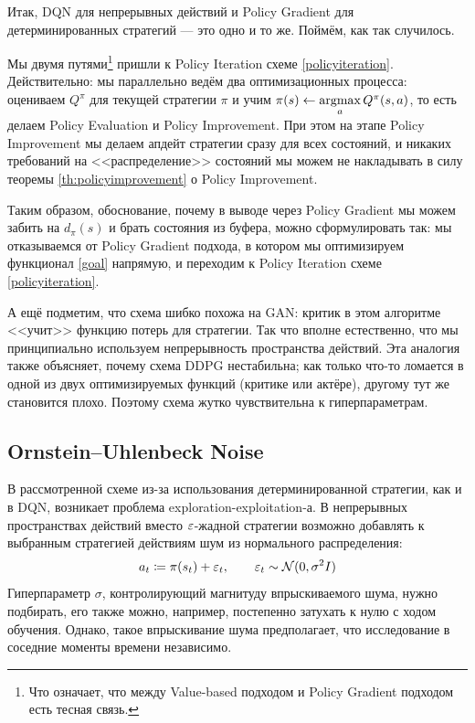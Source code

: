 Итак, DQN для непрерывных действий и Policy Gradient для детерминированных стратегий --- это одно и то же. Поймём, как так случилось.

Мы двумя путями\footnote{Что означает, что между Value-based подходом и Policy Gradient подходом есть тесная связь.} пришли к Policy Iteration схеме \ref{policyiteration}. Действительно: мы параллельно ведём два оптимизационных процесса: оцениваем $Q^\pi$ для текущей стратегии $\pi$ и учим $\pi(s) \leftarrow \mathop{\mathrm{argmax}}\limits_a Q^\pi(s, a)$, то есть делаем Policy Evaluation и Policy Improvement. При этом на этапе Policy Improvement мы делаем апдейт стратегии сразу для всех состояний, и никаких требований на <<распределение>> состояний мы можем не накладывать в силу теоремы \ref{th:policyimprovement} о Policy Improvement. 

Таким образом, обоснование, почему в выводе через Policy Gradient мы можем забить на $d_\pi(s)$ и брать состояния из буфера, можно сформулировать так: мы отказываемся от Policy Gradient подхода, в котором мы оптимизируем функционал \eqref{goal} напрямую, и переходим к Policy Iteration схеме \ref{policyiteration}.

\begin{remark}
А ещё подметим, что схема шибко похожа на GAN: критик в этом алгоритме <<учит>> функцию потерь для стратегии. Так что вполне естественно, что мы принципиально используем непрерывность пространства действий. Эта аналогия также объясняет, почему схема DDPG нестабильна; как только что-то ломается в одной из двух оптимизируемых функций (критике или актёре), другому тут же становится плохо. Поэтому схема жутко чувствительна к гиперпараметрам.
\end{remark}

\subsection{Ornstein--Uhlenbeck Noise}

В рассмотренной схеме из-за использования детерминированной стратегии, как и в DQN, возникает проблема exploration-exploitation-а. В непрерывных пространствах действий вместо $\varepsilon$-жадной стратегии возможно добавлять к выбранным стратегией действиям шум из нормального распределения:
$$a_t \coloneqq \pi(s_t) + \varepsilon_t, \qquad \varepsilon_t \sim \mathcal{N}(0, \sigma^2I)$$
Гиперпараметр $\sigma$, контролирующий магнитуду впрыскиваемого шума, нужно подбирать, его также можно, например, постепенно затухать к нулю с ходом обучения. Однако, такое впрыскивание шума предполагает, что исследование в соседние моменты времени независимо.

